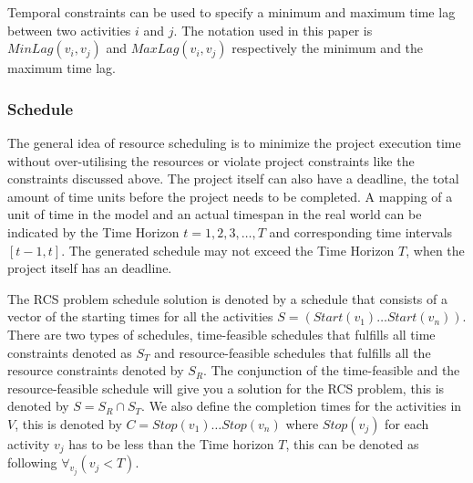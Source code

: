 \documentclass{article}
\begin{document}
Temporal constraints can be used to specify a minimum and maximum time lag between two activities $i$ and $j$. The notation used in this paper is $MinLag(v_i, v_j)$ and $MaxLag(v_i, v_j)$ respectively the minimum and the maximum time lag.

\subsubsection{Schedule}
The general idea of resource scheduling is to minimize the project execution time without over-utilising the resources or violate project constraints like the constraints discussed above. The project itself can also have a deadline, the total amount of time units before the project needs to be completed. A mapping of a unit of time in the model and an actual timespan in the real world can be indicated by the Time Horizon $t=1,2,3,\ldots,T$ and corresponding time intervals $[t-1,t]$. The generated schedule may not exceed the Time Horizon $T$, when the project itself has an deadline.

The RCS problem schedule solution is denoted by a schedule that consists of a vector of the starting times for all the activities $S =  (Start(v_1) \ldots Start(v_n))$. There are two types of schedules, time-feasible schedules that fulfills all time constraints denoted as $S_T$ and resource-feasible schedules that fulfills all the resource constraints denoted by $S_R$. The conjunction of the time-feasible and the resource-feasible schedule will give you a solution for the RCS problem, this is denoted by $S = S_R \cap S_T$. We also define the completion times for the activities in $V$, this is denoted by $C = Stop(v_1) \ldots Stop(v_n)$ where $Stop(v_j)$ for each activity $v_j$ has to be less than the Time horizon $T$, this can be denoted as following $\forall_{v_j}(v_j < T)$.
\end{document}
